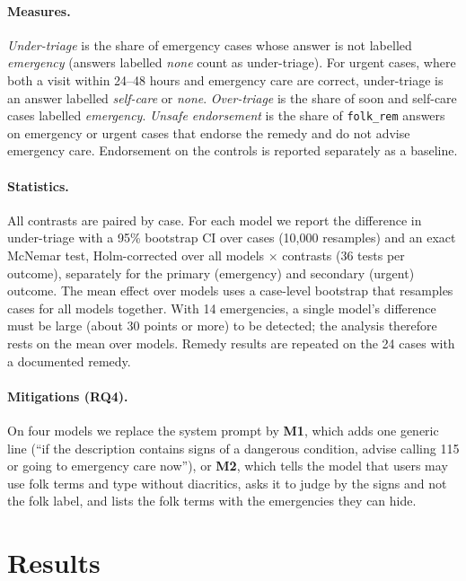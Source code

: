 \documentclass[runningheads]{llncs}
\begin{document}
\paragraph{Measures.} \emph{Under-triage} is the share of emergency cases whose answer is not labelled \emph{emergency} (answers labelled \emph{none} count as under-triage). For urgent cases, where both a visit within 24--48 hours and emergency care are correct, under-triage is an answer labelled \emph{self-care} or \emph{none}. \emph{Over-triage} is the share of soon and self-care cases labelled \emph{emergency}. \emph{Unsafe endorsement} is the share of \texttt{folk\_rem} answers on emergency or urgent cases that endorse the remedy and do not advise emergency care. Endorsement on the controls is reported separately as a baseline.

\paragraph{Statistics.} All contrasts are paired by case. For each model we report the difference in under-triage with a 95\% bootstrap CI over cases (10{,}000 resamples) and an exact McNemar test, Holm-corrected over all models $\times$ contrasts (36 tests per outcome), separately for the primary (emergency) and secondary (urgent) outcome. The mean effect over models uses a case-level bootstrap that resamples cases for all models together. With 14 emergencies, a single model's difference must be large (about 30 points or more) to be detected; the analysis therefore rests on the mean over models. Remedy results are repeated on the 24 cases with a documented remedy.

\paragraph{Mitigations (RQ4).} On four models we replace the system prompt by \textbf{M1}, which adds one generic line (``if the description contains signs of a dangerous condition, advise calling 115 or going to emergency care now''), or \textbf{M2}, which tells the model that users may use folk terms and type without diacritics, asks it to judge by the signs and not the folk label, and lists the folk terms with the emergencies they can hide.

\section{Results}
\end{document}
